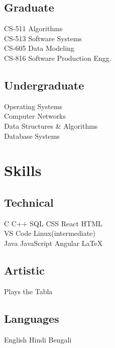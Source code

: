 \documentclass[]{essdee-resume}
\begin{document}
\begin{minipage}[t]{0.33\textwidth}
\subsection{Graduate}
CS-511  Algorithms \\
CS-513  Software Systems \\
CS-605  Data Modeling \\
CS-816 Software Production Engg. \\
\sectionsep

\subsection{Undergraduate}
Operating Systems \\
Computer Networks \\
Data Structures \& Algorithms \\
Database Systems \\



\section{Skills}
\subsection{Technical}
C \textbullet{} C++ \textbullet{} SQL \textbullet{} CSS \textbullet{} React \textbullet{} HTML \\
VS Code \textbullet{} Linux(intermediate) \\ 
Java \textbullet{} JavaScript \textbullet{} Angular\textbullet{}  \LaTeX\
\sectionsep

\subsection{Artistic}
Plays the Tabla \\
\sectionsep

\subsection{Languages}
English \textbullet{} Hindi \textbullet{} Bengali \\
\sectionsep




\end{minipage}
\end{document}
